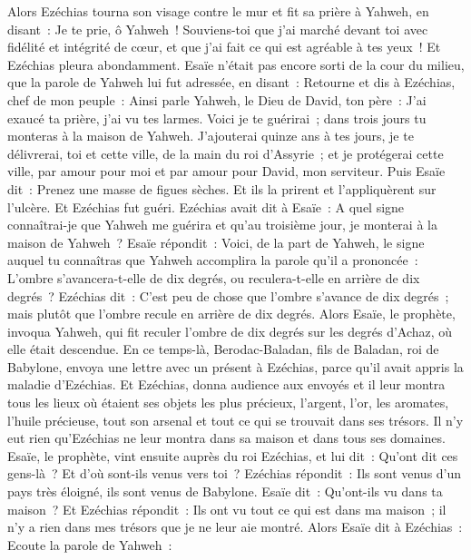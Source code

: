 \begin{multicols}{2}
Alors Ezéchias tourna son visage contre le mur et fit sa prière à Yahweh, en disant~:
Je te prie, ô Yahweh~! Souviens-toi que j'ai marché devant toi avec fidélité et intégrité de cœur, et que j'ai fait ce qui est agréable à tes yeux~! Et Ezéchias pleura abondamment.
Esaïe n'était pas encore sorti de la cour du milieu, que la parole de Yahweh lui fut adressée, en disant~:
Retourne et dis à Ezéchias, chef de mon peuple~: Ainsi parle Yahweh, le Dieu de David, ton père~: J'ai exaucé ta prière, j'ai vu tes larmes. Voici je te guérirai~; dans trois jours tu monteras à la maison de Yahweh.
J'ajouterai quinze ans à tes jours, je te délivrerai, toi et cette ville, de la main du roi d'Assyrie~; et je protégerai cette ville, par amour pour moi et par amour pour David, mon serviteur.
Puis Esaïe dit~: Prenez une masse de figues sèches. Et ils la prirent et l'appliquèrent sur l'ulcère. Et Ezéchias fut guéri.
Ezéchias avait dit à Esaïe~: A quel signe connaîtrai-je que Yahweh me guérira et qu'au troisième jour, je monterai à la maison de Yahweh~?
Esaïe répondit~: Voici, de la part de Yahweh, le signe auquel tu connaîtras que Yahweh accomplira la parole qu'il a prononcée~: L'ombre s'avancera-t-elle de dix degrés, ou reculera-t-elle en arrière de dix degrés~?
Ezéchias dit~: C'est peu de chose que l'ombre s'avance de dix degrés~; mais plutôt que l'ombre recule en arrière de dix degrés.
Alors Esaïe, le prophète, invoqua Yahweh, qui fit reculer l'ombre de dix degrés sur les degrés d'Achaz, où elle était descendue.
En ce temps-là, Berodac-Baladan, fils de Baladan, roi de Babylone, envoya une lettre avec un présent à Ezéchias, parce qu'il avait appris la maladie d'Ezéchias.
Et Ezéchias, donna audience aux envoyés et il leur montra tous les lieux où étaient ses objets les plus précieux, l'argent, l'or, les aromates, l'huile précieuse, tout son arsenal et tout ce qui se trouvait dans ses trésors. Il n'y eut rien qu'Ezéchias ne leur montra dans sa maison et dans tous ses domaines.
Esaïe, le prophète, vint ensuite auprès du roi Ezéchias, et lui dit~: Qu'ont dit ces gens-là~? Et d'où sont-ils venus vers toi~? Ezéchias répondit~: Ils sont venus d'un pays très éloigné, ils sont venus de Babylone.
Esaïe dit~: Qu'ont-ils vu dans ta maison~? Et Ezéchias répondit~: Ils ont vu tout ce qui est dans ma maison~; il n'y a rien dans mes trésors que je ne leur aie montré.
Alors Esaïe dit à Ezéchias~: Ecoute la parole de Yahweh~:

\end{multicols}
